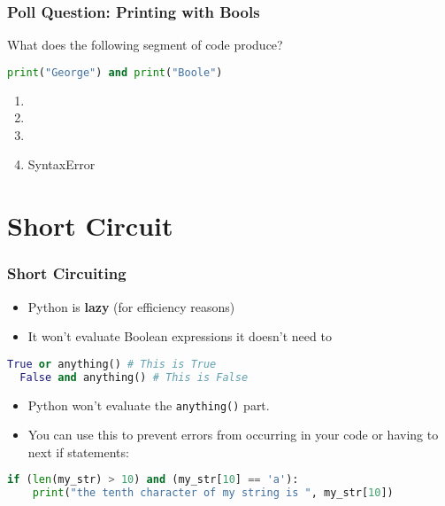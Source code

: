 \documentclass{beamer}
\begin{document}
%
%
\begin{frame}[fragile]
  \frametitle{Poll Question: Printing with Bools}
  What does the following segment of code produce?
  \begin{lstlisting}[language=Python, autogobble]
  print("George") and print("Boole")
  \end{lstlisting}
  \vfill
  \begin{enumerate}[A]
    \item {}
    \item {}
    \item {}
    \item SyntaxError
  \end{enumerate}
\end{frame}

%
%
\section{Short Circuit}
\begin{frame}[fragile]
  \frametitle{Short Circuiting}
  \begin{itemize}
    \item Python is \textbf{lazy} (for efficiency reasons)
    \item It won't evaluate Boolean expressions it doesn't need to
  \end{itemize}
  \vfill
  \begin{lstlisting}[language=Python, autogobble]
  True or anything() # This is True 
  False and anything() # This is False
  \end{lstlisting}
  \vfill
  \begin{itemize}
    \item Python won't evaluate the \lstinline|anything()| part.
    \item You can use this to prevent errors from occurring in your code or having to next if statements:
  \end{itemize}
  \vfill
  \begin{lstlisting}[language=Python, autogobble]
  if (len(my_str) > 10) and (my_str[10] == 'a'):
    print("the tenth character of my string is ", my_str[10])
  \end{lstlisting}
  \vfill
\end{frame}
\end{document}
